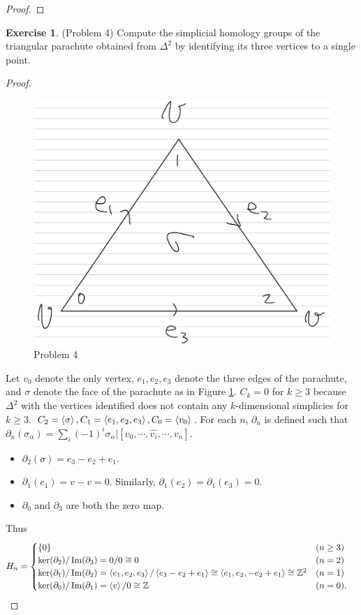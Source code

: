 \documentclass[12pt, psamsfonts]{amsart}
\theoremstyle{definition}
\newtheorem*{exer}{Exercise}
\theoremstyle{remark}
\numberwithin{equation}{section}
\begin{document}
\begin{proof}
\end{proof}

\begin{exer}{(Problem 4)}
  Compute the simplicial homology groups of the triangular parachute obtained from $\Delta^2$ by identifying its three vertices to a single point.
\end{exer}

\begin{proof}
  \begin{figure}
    \includegraphics[width=.5\linewidth]{problem4.jpeg}
    \caption{Problem 4}
    \label{fig:problem4}
  \end{figure}
  Let $v_0$ denote the only vertex, $e_1, e_2, e_3$ denote the three edges of the parachute, and $\sigma$ denote the face of the parachute as in Figure \ref{fig:problem4}.
  $C_k = 0$ for $k \geq 3$ because $\Delta^2$ with the vertices identified does not contain any $k$-dimensional simplicies for $k \geq 3$.
  $C_2 = \ev{ \sigma}, C_1 = \ev{ e_1, e_2, e_3 }, C_0 = \ev{ v_0 }$.
  For each $n$, $\partial_n$ is defined such that $\partial_n(\sigma_{\alpha}) = \sum_{i}(-1)^i\sigma_{\alpha}\vert[v_0, \cdots, \hat{v_i}, \cdots, v_n]$.
  \begin{itemize}
    \item
      $\partial_2(\sigma) = e_3 - e_2 + e_1$.
    \item
      $\partial_1(e_1) = v - v = 0$.
      Similarly, $\partial_1(e_2) = \partial_1(e_3) = 0$.
    \item
      $\partial_0$ and $\partial_3$ are both the zero map.
  \end{itemize}
  Thus
  \begin{align*}
    H_n &= \begin{cases}
      \{ 0 \} & (n \geq 3) \\
      \ker(\partial_2) / \Im(\partial_3) = 0 / 0 \cong 0 & (n = 2) \\
      \ker(\partial_1) / \Im(\partial_2) = \ev{ e_1, e_2, e_3} / \ev{ e_3 - e_2 + e_1} \cong \ev{ e_1, e_2, -e_2 + e_1} \cong \mathbb{Z}^2 & (n = 1) \\
      \ker(\partial_0) / \Im(\partial_1) = \ev{ v } / 0 \cong \mathbb{Z} & (n = 0).
    \end{cases}
  \end{align*}
\end{proof}
\end{document}
